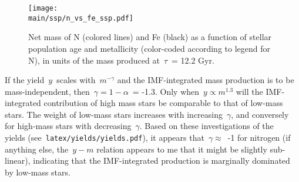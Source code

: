 \documentclass[\main/notes.tex]{subfiles}
\begin{document}
\begin{figure}[t] 
\centering 
\texttt{[image: \\main/ssp/n\_vs\_fe\_ssp.pdf]} 
\caption{Net mass of N (colored lines) and Fe (black) as a function of stellar 
population age and metallicity (color-coded according to legend for N), in 
units of the mass produced at~$\tau$~= 12.2 Gyr. } 
\label{fig:n_vs_fe_ssp} 
\end{figure} 

If the yield~$y$~scales with~$m^{-\gamma}$ and the IMF-integrated mass 
production is to be mass-independent, then~$\gamma = 1 - \alpha$~= -1.3. Only 
when~$y \propto m^{1.3}$ will the IMF-integrated contribution of high mass 
stars be comparable to that of low-mass stars. The weight of low-mass stars 
increases with increasing~$\gamma$, and conversely for high-mass stars with 
decreasing~$\gamma$. Based on these investigations of the~\citet{Cristallo2011} 
yields (see~\texttt{latex/yields/yields.pdf}), it appears 
that~$\gamma \approx$~-1 for nitrogen (if anything else, the~$y-m$ relation 
appears to me that it might be slightly sub-linear), indicating that the 
IMF-integrated production is marginally dominated by low-mass stars. 
\end{document}
